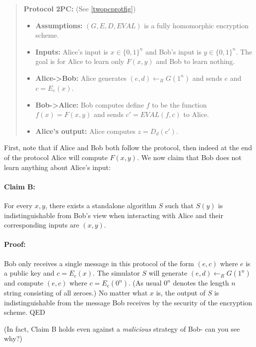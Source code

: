 \begin{quote}
\textbf{Protocol 2PC:} (See \cref{twopcprotfig})

\begin{itemize}
\item
  \textbf{Assumptions:} \((G,E,D,\ensuremath{\mathit{EVAL}})\) is a
  fully homomorphic encryption scheme.
\item
  \textbf{Inputs:} Alice's input is \(x\in\{0,1\}^n\) and Bob's input is
  \(y\in\{0,1\}^n\). The goal is for Alice to learn only \(F(x,y)\) and
  Bob to learn nothing.
\item
  \textbf{Alice-\textgreater Bob:} Alice generates
  \((e,d)\leftarrow_R G(1^n)\) and sends \(e\) and \(c=E_e(x)\).
\item
  \textbf{Bob-\textgreater Alice:} Bob computes define \(f\) to be the
  function \(f(x)=F(x,y)\) and sends
  \(c'=\ensuremath{\mathit{EVAL}}(f,c)\) to Alice.
\item
  \textbf{Alice's output:} Alice computes \(z=D_d(c')\).
\end{itemize}
\end{quote}

First, note that if Alice and Bob both follow the protocol, then indeed
at the end of the protocol Alice will compute \(F(x,y)\). We now claim
that Bob does not learn anything about Alice's input:

\paragraph{Claim B:} For every \(x,y\), there exists a standalone
algorithm \(S\) such that \(S(y)\) is indistinguishable from Bob's view
when interacting with Alice and their corresponding inputs are
\((x,y)\).

\paragraph{Proof:} Bob only receives a single message in this protocol
of the form \((e,c)\) where \(e\) is a public key and \(c=E_e(x)\). The
simulator \(S\) will generate \((e,d) \leftarrow_R G(1^n)\) and compute
\((e,c)\) where \(c=E_e(0^n)\). (As usual \(0^n\) denotes the length
\(n\) string consisting of all zeroes.) No matter what \(x\) is, the
output of \(S\) is indistinguishable from the message Bob receives by
the security of the encryption scheme. QED

(In fact, Claim B holds even against a \emph{malicious} strategy of Bob-
can you see why?)

